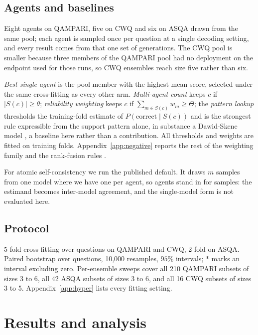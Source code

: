 \documentclass[11pt]{article}
\begin{document}
\subsection{Agents and baselines}

Eight agents on QAMPARI, five on CWQ and six on ASQA drawn from the same pool; each agent is sampled once per question at a single decoding setting, and every result comes from that one set of generations. The CWQ pool is smaller because three members of the QAMPARI pool had no deployment on the endpoint used for those runs, so CWQ ensembles reach size five rather than six.

\emph{Best single agent} is the pool member with the highest mean score, selected under the same cross-fitting as every other arm. \emph{Multi-agent count} keeps $c$ if $|S(c)| \geq \theta$; \emph{reliability weighting} keeps $c$ if $\sum_{m \in S(c)} w_m \geq \Theta$; the \emph{pattern lookup} thresholds the training-fold estimate of $P(\mathrm{correct} \mid S(c))$ and is the strongest rule expressible from the support pattern alone, in substance a Dawid-Skene model \citep{dawid1979maximum}, a baseline here rather than a contribution. All thresholds and weights are fitted on training folds. Appendix~\ref{app:negative} reports the rest of the weighting family and the rank-fusion rules \citep{cormack2009reciprocal}.

For atomic self-consistency \citep{thirukovalluru2024atomic} we run the published default. It draws $m$ samples from one model where we have one per agent, so agents stand in for samples: the estimand becomes inter-model agreement, and the single-model form is not evaluated here.

\subsection{Protocol}
\label{sec:protocol}
\label{sec:crossfit}

5-fold cross-fitting over questions on QAMPARI and CWQ, 2-fold on ASQA. Paired bootstrap over questions, 10,000 resamples, $95\%$ intervals; $*$ marks an interval excluding zero. Per-ensemble sweeps cover all 210 QAMPARI subsets of sizes 3 to 6, all 42 ASQA subsets of sizes 3 to 6, and all 16 CWQ subsets of sizes 3 to 5. Appendix~\ref{app:hyper} lists every fitting setting.

\section{Results and analysis}
\label{sec:results}
\end{document}
